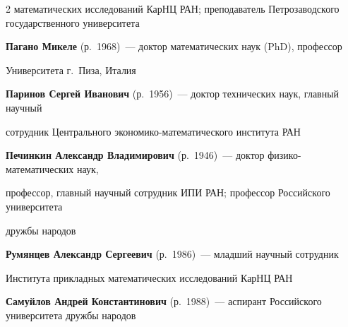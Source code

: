 \begin{multicols}{2}
математических исследований КарНЦ РАН; преподаватель Петрозаводского государственного университета



\vspace*{4pt}



\noindent

\textbf{Пагано Микеле} (р.\ 1968)~--- доктор математических наук (PhD), профессор 

Университета г.\ Пиза, Италия



\vspace*{4pt}



\noindent

\textbf{Паринов Сергей Иванович} (р.\ 1956)~--- доктор технических наук, главный научный

сотрудник Центрального эко\-но\-ми\-ко-ма\-те\-ма\-ти\-че\-ско\-го института РАН



\vspace*{4pt}



\noindent

\textbf{Печинкин Александр Владимирович} (р.\ 1946)~--- доктор физико-математических наук,

профессор, главный научный сотрудник ИПИ РАН; профессор Российского университета

дружбы народов 



\vspace*{4pt}



\noindent

\textbf{Румянцев Александр Сергеевич} (р.\ 1986)~--- младший научный сотрудник 

Института прикладных математических исследований КарНЦ РАН



\vspace*{4pt}



\noindent

\textbf{Самуйлов Андрей Константинович} (р.\ 1988)~--- аспирант Российского университета дружбы народов



\vspace*{4pt}



\noindent


\end{multicols}
